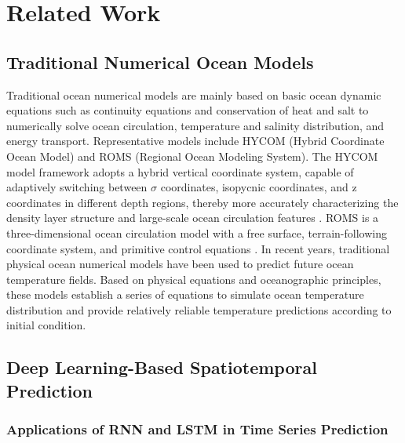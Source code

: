 \documentclass[webpdf,contemporary,large]{oup-authoring-template}
\begin{document}
\section{Related Work}

\subsection{Traditional Numerical Ocean Models}

Traditional ocean numerical models are mainly based on basic ocean dynamic equations such as continuity equations and conservation of heat and salt to numerically solve ocean circulation, temperature and salinity distribution, and energy transport. Representative models include HYCOM (Hybrid Coordinate Ocean Model) and ROMS (Regional Ocean Modeling System).
The HYCOM model framework adopts a hybrid vertical coordinate system, capable of adaptively switching between $\sigma$ coordinates, isopycnic coordinates, and z coordinates in different depth regions, thereby more accurately characterizing the density layer structure and large-scale ocean circulation features \cite{bleckOceanicGeneralCirculation2002}. ROMS is a three-dimensional ocean circulation model with a free surface, terrain-following coordinate system, and primitive control equations \cite{LiZhenXiTaiPingYangYangLiuXiTongDuiHaiPingMianGaoDuBianHuaDeXiangYingJiYuQuYuHaiYangMoShiROMSShiYan2025}.
In recent years, traditional physical ocean numerical models have been used to predict future ocean temperature fields. Based on physical equations and oceanographic principles, these models establish a series of equations to simulate ocean temperature distribution and provide relatively reliable temperature predictions according to initial condition.

\subsection{Deep Learning-Based Spatiotemporal Prediction}

\subsubsection{Applications of RNN and LSTM in Time Series Prediction}
\end{document}
